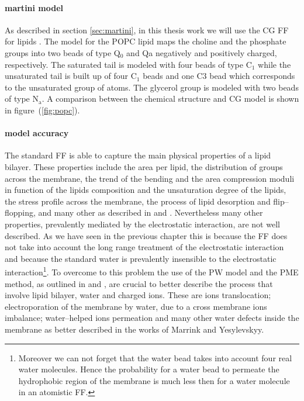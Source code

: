 \paragraph{\textbf{martini model}} As described in section \ref{sec:martini}, in this thesis work we will use the 
\ac{CG} \martini \ac{FF} for lipids \cite{Martini}.
The \martini model for the \ac{POPC} lipid maps the choline and the phosphate groups into two beads of type Q$_0$ 
and Qa negatively and positively charged, respectively. The saturated tail is modeled with four beads of type 
C$_1$ while the unsaturated tail is built up of four C$_1$ beads and one C$3$ bead which corresponds to the 
unsaturated group of atoms. The glycerol group is modeled with two beads of type N$_\text{a}$. A comparison 
between the chemical structure and \ac{CG} model is shown in figure~(\ref{fig:popc}).

\paragraph{\textbf{model accuracy}} The standard \martini \ac{FF} is able to capture the main physical properties 
of a lipid bilayer. These properties include the area per lipid, the distribution of groups across the membrane, 
the trend of the bending and the area compression moduli in function of the lipids composition and the 
unsaturation degree of the lipids, the stress profile across the membrane, the process of lipid desorption and 
flip--flopping, and many other as described in \cite{Martini} and \cite{MartiniReview}. Nevertheless many other 
properties, prevalently mediated by the electrostatic interaction, are not well described. As we have seen in the 
previous chapter this is because the \martini \ac{FF} does not take into account the long range treatment of the 
electrostatic interaction and because the standard \martini water is prevalently insensible to the electrostatic 
interaction\footnote{Moreover we can not forget that the \martini water bead takes into account four real water 
molecules. Hence the probability for a \martini water bead to permeate the hydrophobic region of the membrane is 
much less then for a water molecule in an atomistic \ac{FF}.}. To overcome to this problem the use of the \ac{PW} 
model and the \ac{PME} method, as outlined in \cite{MartiniReview} and \cite{PW}, are crucial to better describe 
the process that involve lipid bilayer, water and charged ions. These are ions translocation; electroporation of 
the membrane by water, due to a cross membrane ions imbalance; water--helped ions permeation and many other water 
defects inside the membrane as better described in the works of Marrink and Yesylevskyy.

